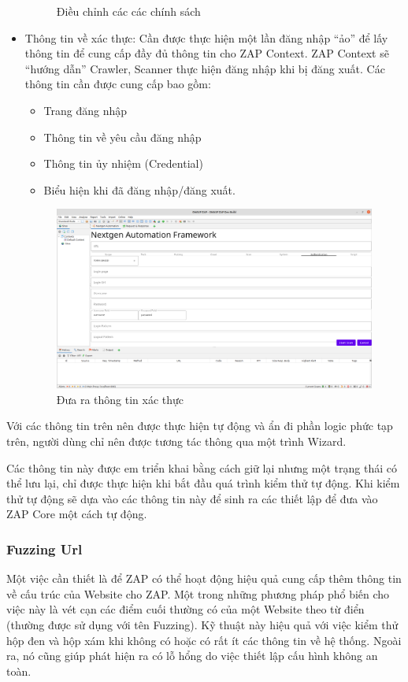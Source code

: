 \documentclass[./../main.tex]{subfiles}
\begin{document}
\begin{itemize}
\begin{figure}[H]
		      \caption{ Điều chỉnh các các chính sách }
		      \label{fig:policy}
	      \end{figure}
	\item Thông tin về xác thực: Cần được thực hiện một lần đăng nhập
	      “ảo” để lấy thông tin để cung cấp đầy đủ thông tin cho ZAP Context.
	      ZAP Context sẽ “hướng dẫn” Crawler, Scanner thực hiện đăng nhập khi
	      bị đăng xuất. Các thông tin cần được cung cấp bao gồm:
	      \begin{itemize}
		      \item Trang đăng nhập
		      \item Thông tin về yêu cầu đăng nhập
		      \item Thông tin ủy nhiệm (Credential)
		      \item Biểu hiện khi đã đăng nhập/đăng xuất.
	      \end{itemize}
	      \begin{figure}[H]
		      \includegraphics[width=\linewidth]{./images/authen.png}
		      \caption{ Đưa ra thông tin xác thực }
		      \label{fig:authen}
	      \end{figure}

\end{itemize}
Với các thông tin trên nên được thực hiện tự động và ẩn đi phần logic
phức tạp trên, người dùng chỉ nên được tương tác thông qua một trình
Wizard.

Các thông tin này được em triển khai bằng cách giữ lại nhưng một
trạng thái có thể lưu lại, chỉ được thực hiện khi bắt đầu quá trình
kiểm thử tự động. Khi kiểm thử tự động sẽ dựa vào các thông tin này
để sinh ra các thiết lập để đưa vào ZAP Core một cách tự động.

\subsubsection{Fuzzing Url}
Một việc cần thiết là để ZAP có thể hoạt động hiệu quả cung cấp thêm
thông tin về cấu trúc của Website cho ZAP. Một trong những phương pháp
phổ biến cho việc này là vét cạn các điểm cuối thường có của một Website
theo từ điển (thường được sử dụng với tên Fuzzing). Kỹ thuật này hiệu
quả với việc kiểm thử hộp đen và hộp xám khi không có hoặc có rất ít
các thông tin về hệ thống. Ngoài ra, nó cũng giúp phát hiện ra có lỗ
hổng do việc thiết lập cấu hình không an toàn.
\end{document}
